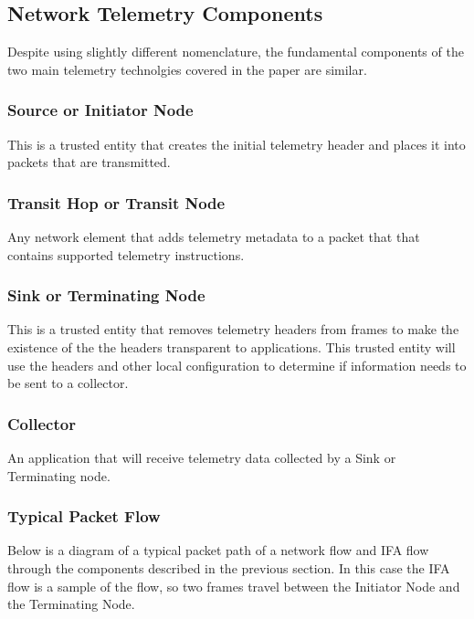 \documentclass[letterpaper,twocolumn,10pt]{article}
\begin{document}
\subsection{Network Telemetry Components}

Despite using slightly different nomenclature, the fundamental
components of the two main telemetry technolgies covered in the paper
are similar.

\subsubsection{Source or Initiator Node}
This is a trusted entity that creates the initial telemetry header and
places it into packets that are transmitted.

\subsubsection{Transit Hop or Transit Node}
Any network element that adds telemetry metadata to a packet that
that contains supported telemetry instructions.

\subsubsection{Sink or Terminating Node}
This is a trusted entity that removes telemetry headers from frames to
make the existence of the the headers transparent to applications.  This
trusted entity will use the headers and other local configuration to
determine if information needs to be sent to a collector.

\subsubsection{Collector}
An application that will receive telemetry data collected by a Sink or
Terminating node.

\subsubsection{Typical Packet Flow}

Below is a diagram of a typical packet path of a network flow and IFA
flow through the components described in the previous section.  In this
case the IFA flow is a sample of the flow, so two frames travel between
the Initiator Node and the Terminating Node.
\end{document}
